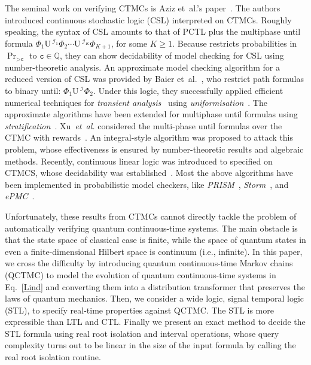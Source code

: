\documentclass[a4paper,UKenglish,cleveref,autoref,thm-restate,authorcolumns]{lipics-v2019}
\newcommand{\I}{\mathcal{I}}
\newcommand{\ntl}{\mathrm{U}\,}
\begin{document}
The seminal work on verifying CTMCs is Aziz et~al.'s paper~\cite{ASS+96,ASS+00}.
The authors introduced continuous stochastic logic (CSL) interpreted on CTMCs.
Roughly speaking, the syntax of CSL amounts to
that of PCTL plus the multiphase until formula
$\Phi_1 \ntl^{\I_1} \Phi_2 \cdots \ntl^{\I_K} \Phi_{K+1}$,
for some $K \ge 1$.
Because \cite{ASS+96} restricts probabilities in $\Pr_{>\texttt{c}}$
to $\texttt{c} \in \mathbb{Q}$,
they can show decidability of model checking for CSL
using number-theoretic analysis.
An approximate model checking algorithm for a reduced version of CSL
was provided by Baier et~al.~\cite{BKH99},
who restrict path formulas to binary until: $\Phi_1 \ntl^\I \Phi_2$.
Under this logic, they successfully applied efficient numerical techniques
for \emph{transient analysis}~\cite{BHH+03}
using \emph{uniformisation}~\cite{Ste94}.
The approximate algorithms have been extended
for multiphase until formulas
using \emph{stratification}~\cite{ZJN+11,ZJN+12}.
Xu~\textit{et~al.} considered the multi-phase until formulas
over the CTMC with rewards~\cite{XZJ+16}.
An integral-style algorithm was proposed to attack this problem,
whose effectiveness is ensured by number-theoretic results and algebraic methods.
Recently, continuous linear logic was introduced to specified on CTMCS,
whose decidability was established~\cite{GuY20}.
Most the above algorithms have been implemented in probabilistic model checkers,
like \textsl{PRISM}~\cite{KNP11}, \textsl{Storm}~\cite{DJK+17},
and \textsl{ePMC}~\cite{HLS+14}.

Unfortunately, these results from CTMCs cannot directly tackle the problem of
automatically verifying quantum continuous-time systems.
The main obstacle is that the state space of classical case is finite,
while the space of quantum states in even a finite-dimensional Hilbert space
is continuum (i.e., infinite).
In this paper, we cross the difficulty
by introducing quantum continuous-time Markov chains (QCTMC)
to model the evolution of quantum continuous-time systems in Eq.~\eqref{Lind}
and converting them into a distribution transformer
that preserves the laws of quantum mechanics.
Then, we consider a wide logic, signal temporal logic (STL),
to specify real-time properties against QCTMC.
The STL is more expressible than LTL and CTL.
Finally we present an exact method to decide the STL formula
using real root isolation and interval operations,
whose query complexity turns out to be linear in the size of the input formula
by calling the real root isolation routine.
\end{document}
